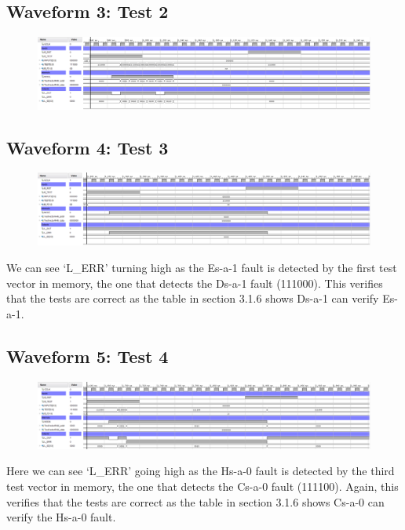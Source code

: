 \documentclass[11pt]{report}
\begin{document}
\subsection*{Waveform 3: Test 2}
\begin{figure}[H]
    \includegraphics[width=\columnwidth]{Assets/3.2.3_test2.png}
\end{figure}

\subsection*{Waveform 4: Test 3}
\begin{figure}[H]
    \includegraphics[width=\columnwidth]{Assets/3.2.3_test3.png}
\end{figure}

We can see `L\_ERR' turning high as the Es-a-1 fault is detected by the first test vector in memory, the one that detects the Ds-a-1 fault (111000). This verifies that the tests are correct as the table in section 3.1.6 shows Ds-a-1 can verify Es-a-1.


\subsection*{Waveform 5: Test 4}
\begin{figure}[H]
    \includegraphics[width=\columnwidth]{Assets/3.2.3_test4.png}
\end{figure}

Here we can see `L\_ERR' going high as the Hs-a-0 fault is detected by the third test vector in memory, the one that detects the Cs-a-0 fault (111100). Again, this verifies that the tests are correct as the table in section 3.1.6 shows Cs-a-0 can verify the Hs-a-0 fault.
\end{document}
